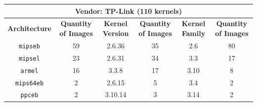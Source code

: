 \begin{table}[H]
{\begin{tabular}{|c|c|c|c|c|c|}
\multicolumn{6}{|c|}{\textbf{Vendor: TP-Link} (110 kernels)}                                                                    \\ \hline
\textbf{Architecture} & \multicolumn{1}{c|}{\textbf{Quantity of Images}} & \textbf{Kernel Version} & \multicolumn{1}{c|}{\textbf{Quantity of Images}} & \textbf{Kernel Family} & \textbf{Quantity of Images} \\ \hline
{\tt mipseb}            & \multicolumn{1}{c|}{59}                & 2.6.36                  & \multicolumn{1}{c|}{35}                          & 2.6                     & 80                         \\
{\tt mipsel}            & \multicolumn{1}{c|}{23}                & 2.6.31                  & \multicolumn{1}{c|}{34}                          & 3.3                     & 17                         \\
{\tt armel}             & \multicolumn{1}{c|}{16}                & 3.3.8                   & \multicolumn{1}{c|}{17}                          & 3.10                    & 8                          \\
{\tt mips64eb}          & \multicolumn{1}{c|}{2}                 & 2.6.15                  & \multicolumn{1}{c|}{5}                           & 3.4                     & 2                          \\
{\tt ppceb}             & \multicolumn{1}{c|}{2}                 & 3.10.14                 & \multicolumn{1}{c|}{3}                           & 3.14                    & 2                          \\ \hline


\end{tabular}}
\end{table}

